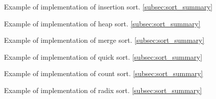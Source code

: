 \begin{example}
    \label{eg:insertion_sort}
    Example of implementation of insertion sort. \ref{subsec:sort_summary}
\end{example}


\begin{example}
    \label{eg:heap_sort}
    Example of implementation of heap sort. \ref{subsec:sort_summary}
\end{example}


\begin{example}
    \label{eg:merge_sort}
    Example of implementation of merge sort. \ref{subsec:sort_summary}
\end{example}


\begin{example}
    \label{eg:quick_sort}
    Example of implementation of quick sort. \ref{subsec:sort_summary}
\end{example}


\begin{example}
    \label{eg:count_sort}
    Example of implementation of count sort. \ref{subsec:sort_summary}
\end{example}


\begin{example}
    \label{eg:radix_sort}
    Example of implementation of radix sort. \ref{subsec:sort_summary}
\end{example}
